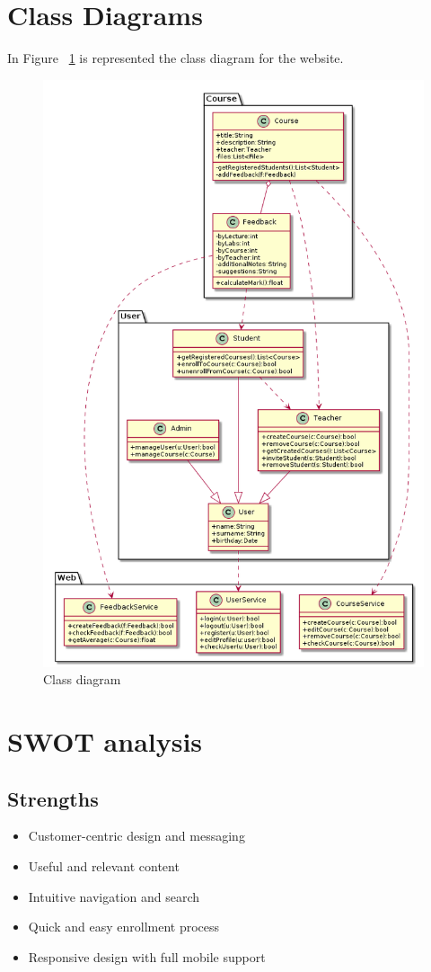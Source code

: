 \documentclass[12pt,a4paper,titlepage]{article}
\begin{document}
\section{Class Diagrams}
In Figure ~\ref{fig:class} is represented the class diagram for the website.
\begin{figure}[H]
	\includegraphics[width=15cm]{class}
	\caption{Class diagram}
	\centering
	\label{fig:class}
\end{figure}




\section{SWOT analysis}
\subsection{Strengths}
\begin{itemize}
	\item Customer-centric design and messaging
	\item Useful and relevant content
	\item Intuitive navigation and search
	\item Quick and easy enrollment process
	\item Responsive design with full mobile support
\end{itemize}
\end{document}
